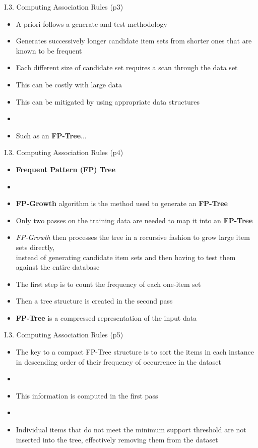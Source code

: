 \documentclass[handout]{beamer}
\newcommand{\strong}[1]{\textbf{\color{teal} #1}}
\newcommand{\stronger}[1]{\textbf{\color{purple} #1}}
\begin{document}
\begin{frame}{I.3. Computing Association Rules (p3)}
\begin{itemize}
\item A priori follows a generate-and-test methodology
\item Generates successively longer candidate item sets from shorter ones that are known to be frequent
\item Each different size of candidate set requires a scan through the data set
\item This can be costly with large data
\item This can be mitigated by using appropriate data structures
\item[]
\item[] Such as an \stronger{FP-Tree}...
\end{itemize}
\end{frame}
\begin{frame}{I.3. Computing Association Rules (p4)}
\begin{itemize}
\item[] \stronger{Frequent Pattern (FP) Tree}
\item[]
\item \strong{FP-Growth} algorithm is the method used to generate an \stronger{FP-Tree}
\item Only two passes on the training data are needed to map it into an \strong{FP-Tree}
\item \emph{FP-Growth} then processes the tree in a recursive fashion to grow large item sets directly,\\
instead of generating candidate item sets and then having to test them against the entire database
\item The first step is to count the frequency of each one-item set
\item Then a tree structure is created in the second pass
\item \strong{FP-Tree} is a compressed representation of the input data
\end{itemize}
\end{frame}
\begin{frame}{I.3. Computing Association Rules (p5)}
\begin{itemize}
\item The key to a compact FP-Tree structure is to sort the items in each instance in descending order of their frequency of occurrence in the dataset
\item[]
\item This information is computed in the first pass
\item[]
\item Individual items that do not meet the minimum support threshold are not inserted into the tree, effectively removing them from the dataset
\end{itemize}
\end{frame}
\end{document}
